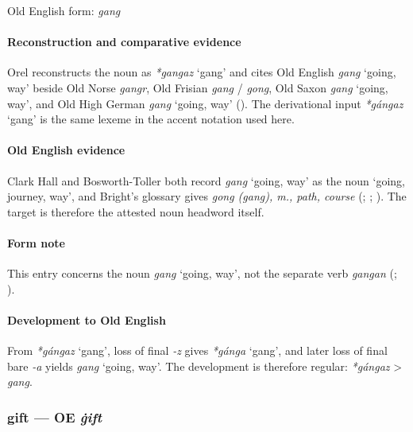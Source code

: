 \documentclass[
  british,
  a4paper,
]{article}
\providecommand{\Recon}[1]{\emph{*#1}}
\begin{document}
Old English form: \emph{gang}

\paragraph{Reconstruction and comparative
evidence}\label{reconstruction-and-comparative-evidence-26}

Orel reconstructs the noun as \Recon{gangaz} `gang' and cites Old
English {\emph{gang}} `going, way' beside Old Norse \emph{gangr}, Old
Frisian \emph{gang} / \emph{gong}, Old Saxon {\emph{gang}} `going, way',
and Old High German {\emph{gang}} `going, way'
(). The derivational input
\Recon{gángaz} `gang' is the same lexeme in the accent notation used
here.

\paragraph{Old English evidence}\label{old-english-evidence-26}

Clark Hall and Bosworth-Toller both record {\emph{gang}} `going, way' as
the noun `going, journey, way', and Bright's glossary gives \emph{gong
(gang), m., path, course} (; ;
). The target
is therefore the attested noun headword itself.

\paragraph{Form note}\label{form-note-3}

This entry concerns the noun {\emph{gang}} `going, way', not the
separate verb \emph{gangan} (; ).

\paragraph{Development to Old
English}\label{development-to-old-english-26}

From \Recon{gángaz} `gang', loss of final \emph{-z} gives \Recon{gánga}
`gang', and later loss of final bare \emph{-a} yields {\emph{gang}}
`going, way'. The development is therefore regular: \emph{*gángaz}
\textgreater{} \emph{gang}.

\subsubsection{\texorpdfstring{gift --- OE
\emph{ġift}}{gift --- OE ġift}}\label{gift-oe-ux121ift}
\end{document}
